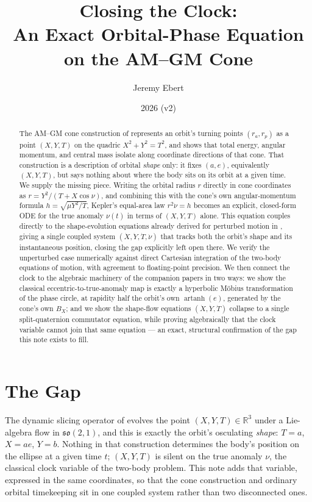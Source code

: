 \documentclass[12pt]{amsart}
\title[The Orbital Phase Equation on the AM--GM Cone]{Closing the Clock:\\
An Exact Orbital-Phase Equation on the AM--GM Cone}
\author{Jeremy Ebert}
\date{2026 (v2)}
\theoremstyle{plain}
\theoremstyle{remark}
\begin{document}
\maketitle

\begin{abstract}
The AM--GM cone construction of \cite{Ebert2026Cone} represents an orbit's turning points $(r_a,r_p)$ as a point $(X,Y,T)$ on the quadric $X^2+Y^2=T^2$, and shows that total energy, angular momentum, and central mass isolate along coordinate directions of that cone. That construction is a description of orbital \emph{shape} only: it fixes $(a,e)$, equivalently $(X,Y,T)$, but says nothing about where the body sits on its orbit at a given time. We supply the missing piece. Writing the orbital radius $r$ directly in cone coordinates as $r=Y^2/(T+X\cos\nu)$, and combining this with the cone's own angular-momentum formula $h=\sqrt{\mu Y^2/T}$, Kepler's equal-area law $r^2\dot\nu=h$ becomes an explicit, closed-form ODE for the true anomaly $\nu(t)$ in terms of $(X,Y,T)$ alone. This equation couples directly to the shape-evolution equations already derived for perturbed motion in \cite{Ebert2026Cone}, giving a single coupled system $(\dot X,\dot Y,\dot T,\dot\nu)$ that tracks both the orbit's shape and its instantaneous position, closing the gap explicitly left open there. We verify the unperturbed case numerically against direct Cartesian integration of the two-body equations of motion, with agreement to floating-point precision. We then connect the clock to the algebraic machinery of the companion papers \cite{Ebert2026Table,Ebert2026EigenCoord} in two ways: we show the classical eccentric-to-true-anomaly map is exactly a hyperbolic Möbius transformation of the phase circle, at rapidity half the orbit's own $\operatorname{artanh}(e)$, generated by the cone's own $B_X$; and we show the shape-flow equations $(\dot X,\dot Y,\dot T)$ collapse to a single split-quaternion commutator equation, while proving algebraically that the clock variable cannot join that same equation --- an exact, structural confirmation of the gap this note exists to fill.
\end{abstract}

\section{The Gap}

The dynamic slicing operator of \cite{Ebert2026Cone} evolves the point $(X,Y,T)\in\mathbb{R}^3$ under a Lie-algebra flow in $\mathfrak{so}(2,1)$, and this is exactly the orbit's osculating \emph{shape}: $T=a$, $X=ae$, $Y=b$. Nothing in that construction determines the body's position on the ellipse at a given time $t$; $(X,Y,T)$ is silent on the true anomaly $\nu$, the classical clock variable of the two-body problem. This note adds that variable, expressed in the same coordinates, so that the cone construction and ordinary orbital timekeeping sit in one coupled system rather than two disconnected ones.
\end{document}
